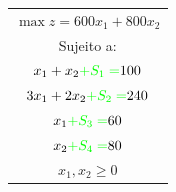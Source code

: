 \documentclass{beamer}
\begin{document}
\begin{frame}
\begin{columns}
\begin{column}{4cm}
			\scriptsize
			\begin{table}
				\begin{tabular}{c}
					\cellcolor{red!50} $ \max z = 600x_1 + 800x_2 $ \\
					\cellcolor{red!50} Sujeito a: \\
					\cellcolor{red!50} $x_1 + x_2 {\color{green}+ S_1 =}  100$ \\
					\cellcolor{red!50} $3x_1 + 2x_2 {\color{green}+ S_2 =}  240$ \\
					\cellcolor{red!50} $x_1 {\color{green}+ S_3 =}  60 $  \\
					\cellcolor{red!50} $x_2 {\color{green}+ S_4 =}  80 $ \\
				    \cellcolor{red!50} $x_1, x_2 \ge 0 $ \\
				\end{tabular}
			\end{table}
		\end{column}
	\end{columns}
	

\end{frame}
\end{document}
